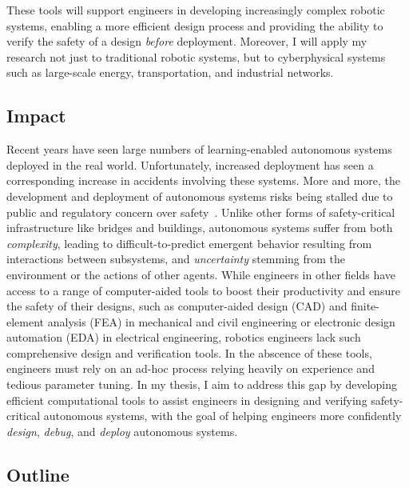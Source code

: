 These tools will support engineers in developing increasingly complex robotic systems, enabling a more efficient design process and providing the ability to verify the safety of a design \textit{before} deployment. Moreover, I will apply my research not just to traditional robotic systems, but to cyberphysical systems such as large-scale energy, transportation, and industrial networks.

\subsection{Impact}

Recent years have seen large numbers of learning-enabled autonomous systems deployed in the real world. Unfortunately, increased deployment has seen a corresponding increase in accidents involving these systems. More and more, the development and deployment of autonomous systems risks being stalled due to public and regulatory concern over safety~\cite{posadaEA22002Autopilot}. Unlike other forms of safety-critical infrastructure like bridges and buildings, autonomous systems suffer from both \textit{complexity}, leading to difficult-to-predict emergent behavior resulting from interactions between subsystems, and \textit{uncertainty} stemming from the environment or the actions of other agents. While engineers in other fields have access to a range of computer-aided tools to boost their productivity and ensure the safety of their designs, such as computer-aided design (CAD) and finite-element analysis (FEA) in mechanical and civil engineering or electronic design automation (EDA) in electrical engineering, robotics engineers lack such comprehensive design and verification tools. In the abscence of these tools, engineers must rely on an ad-hoc process relying heavily on experience and tedious parameter tuning. In my thesis, I aim to address this gap by developing efficient computational tools to assist engineers in designing and verifying safety-critical autonomous systems, with the goal of helping engineers more confidently \textit{design}, \textit{debug}, and \textit{deploy} autonomous systems.

\subsection{Outline}

